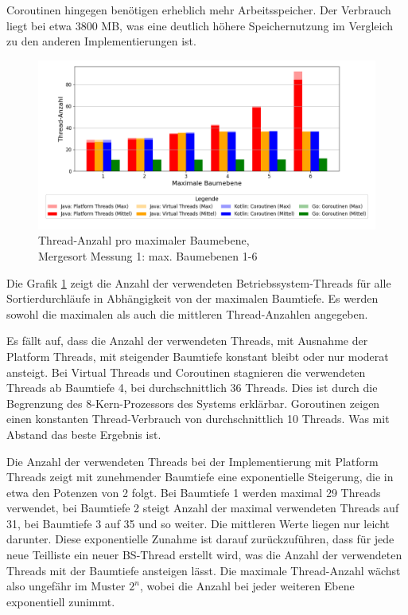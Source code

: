 \documentclass[fontsize=12pt,paper=a4,twoside=semi,parskip=half-,headsepline,headinclude]{scrreprt}
\begin{document}
Coroutinen hingegen benötigen erheblich mehr Arbeitsspeicher. Der Verbrauch liegt bei etwa  3800 MB, was eine deutlich höhere Speichernutzung im Vergleich zu den anderen Implementierungen ist.

\begin{figure}[H]
	\centering
	\includegraphics[scale=0.5]{figures/mergesort/Maximalebauebenen1-6/num_threads_bar_plot.png}
	\caption{Thread-Anzahl pro maximaler Baumebene,\\ Mergesort Messung 1: max. Baumebenen 1-6}
	\label{fig:ms1-6Threads}
\end{figure}

Die Grafik \ref{fig:ms1-6Threads} zeigt die Anzahl der verwendeten Betriebssystem-Threads für alle Sortierdurchläufe in Abhängigkeit von der maximalen Baumtiefe. Es werden sowohl die maximalen als auch die mittleren Thread-Anzahlen angegeben.

Es fällt auf, dass die Anzahl der verwendeten Threads, mit Ausnahme der Platform Threads, mit steigender Baumtiefe konstant bleibt oder nur moderat ansteigt. Bei Virtual Threads und Coroutinen stagnieren die verwendeten Threads ab Baumtiefe 4, bei durchschnittlich 36 Threads. Dies ist durch die Begrenzung des 8-Kern-Prozessors des Systems erklärbar. Goroutinen zeigen einen konstanten Thread-Verbrauch von durchschnittlich 10 Threads. Was mit Abstand das beste Ergebnis ist. 

Die Anzahl der verwendeten Threads bei der Implementierung mit Platform Threads zeigt mit zunehmender Baumtiefe eine exponentielle Steigerung, die in etwa den Potenzen von 2 folgt. Bei Baumtiefe 1 werden maximal 29 Threads verwendet, bei Baumtiefe 2 steigt Anzahl der maximal verwendeten Threads auf 31, bei Baumtiefe 3 auf 35 und so weiter. Die mittleren Werte liegen nur leicht darunter. Diese exponentielle Zunahme ist darauf zurückzuführen, dass für jede neue Teilliste ein neuer BS-Thread erstellt wird, was die Anzahl der verwendeten Threads mit der Baumtiefe ansteigen lässt. Die maximale Thread-Anzahl wächst also ungefähr im Muster $2^n$, wobei die Anzahl bei jeder weiteren Ebene exponentiell zunimmt.
\end{document}
